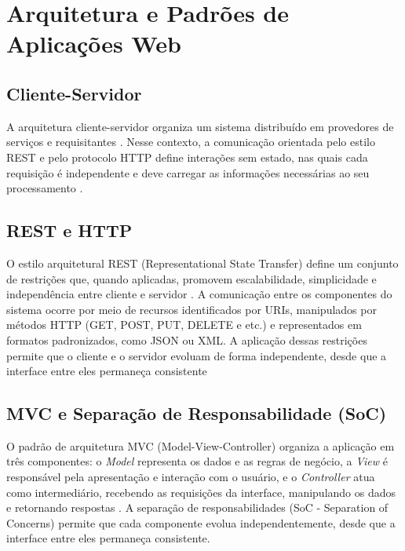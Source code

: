 \section{Arquitetura e Padrões de Aplicações Web}
\label{sec:arquitetura-padroes-aplicacoes-web}

\subsection{Cliente-Servidor}
\label{subsec:cliente-servidor}
A arquitetura cliente-servidor organiza um sistema distribuído em provedores de
serviços e requisitantes \cite{Tanenbaum2007}. Nesse contexto, a comunicação
orientada pelo estilo REST e pelo protocolo HTTP define interações sem estado,
nas quais cada requisição é independente e deve carregar as informações
necessárias ao seu processamento \cite{rfc9110}.

\subsection{REST e HTTP}
\label{subsec:rest-http}
O estilo arquitetural REST (Representational State Transfer) define um conjunto de
restrições que, quando aplicadas, promovem escalabilidade, simplicidade e independência
entre cliente e servidor \cite{fielding2000}. A comunicação entre os componentes do
sistema ocorre por meio de recursos identificados por URIs, manipulados por métodos
HTTP (GET, POST, PUT, DELETE e etc.) e representados em formatos padronizados, como
JSON ou XML. A aplicação dessas restrições permite que o cliente e o servidor
evoluam de forma independente, desde que a interface entre eles permaneça consistente



\newpage


\subsection{MVC e Separação de Responsabilidade (SoC)}
\label{subsec:mvc-soc}
O padrão de arquitetura MVC (Model-View-Controller) organiza a aplicação em três
componentes: o \textit{Model} representa os dados e as regras de negócio, a \textit{View}
é responsável pela apresentação e interação com o usuário, e o \textit{Controller} atua
como intermediário, recebendo as requisições da interface, manipulando os dados e retornando
respostas \cite{gamma1994}. A separação de responsabilidades (SoC - Separation of Concerns)
permite que cada componente evolua independentemente, desde que a interface entre eles
permaneça consistente.

